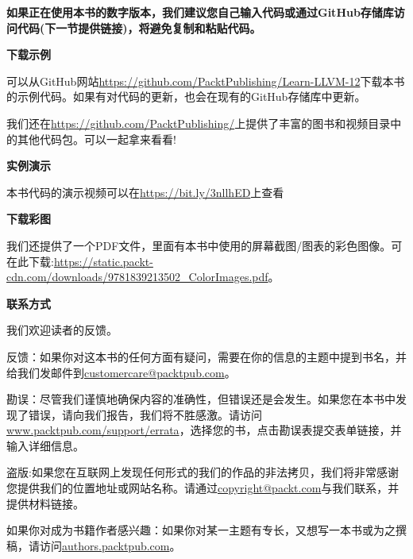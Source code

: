 \textbf{如果正在使用本书的数字版本，我们建议您自己输入代码或通过GitHub存储库访问代码(下一节提供链接)，将避免复制和粘贴代码。}\par

\hspace*{\fill} \par %
\textbf{下载示例}

可以从GitHub网站\url{https://github.com/PacktPublishing/Learn-LLVM-12}下载本书的示例代码。如果有对代码的更新，也会在现有的GitHub存储库中更新。\par

我们还在\url{https://github.com/PacktPublishing/}上提供了丰富的图书和视频目录中的其他代码包。可以一起拿来看看!\par

\hspace*{\fill} \par %
\textbf{实例演示}

本书代码的演示视频可以在\url{https://bit.ly/3nllhED}上查看 \par

\hspace*{\fill} \par %
\textbf{下载彩图}

我们还提供了一个PDF文件，里面有本书中使用的屏幕截图/图表的彩色图像。可在此下载:\url{https://static.packt-cdn.com/downloads/9781839213502\_ColorImages.pdf}。\par

\hspace*{\fill} \par %
\textbf{联系方式}

我们欢迎读者的反馈。\par

反馈：如果你对这本书的任何方面有疑问，需要在你的信息的主题中提到书名，并给我们发邮件到\url{customercare@packtpub.com}。\par

勘误：尽管我们谨慎地确保内容的准确性，但错误还是会发生。如果您在本书中发现了错误，请向我们报告，我们将不胜感激。请访问\url{www.packtpub.com/support/errata}，选择您的书，点击勘误表提交表单链接，并输入详细信息。\par

盗版:如果您在互联网上发现任何形式的我们的作品的非法拷贝，我们将非常感谢您提供我们的位置地址或网站名称。请通过\url{copyright@packt.com}与我们联系，并提供材料链接。\par

如果你对成为书籍作者感兴趣：如果你对某一主题有专长，又想写一本书或为之撰稿，请访问\url{authors.packtpub.com}。\par

